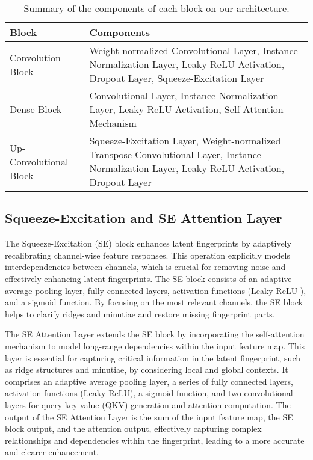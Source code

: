 \documentclass[twocolumn, switch]{article} %
\begin{document}
\begin{table}[H]
\centering
\footnotesize	
\begin{tabular}{|l|p{4.6cm}|}
\hline
\textbf{Block} & \textbf{Components} \\
\hline
Convolution Block & Weight-normalized Convolutional Layer, Instance Normalization Layer, Leaky ReLU Activation, Dropout Layer, Squeeze-Excitation Layer \\
\hline
Dense Block & Convolutional Layer, Instance Normalization Layer, Leaky ReLU Activation, Self-Attention Mechanism \\
\hline
Up-Convolutional Block & Squeeze-Excitation Layer, Weight-normalized Transpose Convolutional Layer, Instance Normalization Layer, Leaky ReLU Activation, Dropout Layer \\
\hline
\end{tabular}
\caption{Summary of the components of each block on our architecture.}
\label{tab:block-components2}
\end{table}



\subsection{Squeeze-Excitation and SE Attention Layer}
\label{Squeeze}

The Squeeze-Excitation (SE) block \cite{DBLP:journals/corr/abs-1709-01507} enhances latent fingerprints by adaptively recalibrating channel-wise feature responses. This operation explicitly models interdependencies between channels, which is crucial for removing noise and effectively enhancing latent fingerprints. The SE block consists of an adaptive average pooling layer, fully connected layers, activation functions (Leaky ReLU \cite{maas2013rectifier}), and a sigmoid function. By focusing on the most relevant channels, the SE block helps to clarify ridges and minutiae and restore missing fingerprint parts.

The SE Attention Layer extends the SE block by incorporating the self-attention mechanism \cite{DBLP:journals/corr/VaswaniSPUJGKP17} to model long-range dependencies within the input feature map. This layer is essential for capturing critical information in the latent fingerprint, such as ridge structures and minutiae, by considering local and global contexts. It comprises an adaptive average pooling layer, a series of fully connected layers, activation functions (Leaky ReLU), a sigmoid function, and two convolutional layers for query-key-value (QKV) generation and attention computation. The output of the SE Attention Layer is the sum of the input feature map, the SE block output, and the attention output, effectively capturing complex relationships and dependencies within the fingerprint, leading to a more accurate and clearer enhancement.
\end{document}
